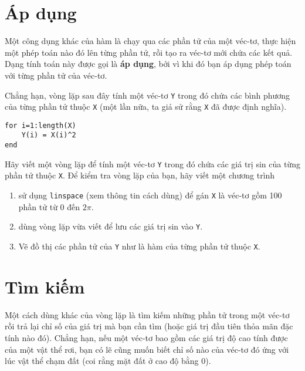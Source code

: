\documentclass[12pt]{book}
\begin{document}
\section{Áp dụng}
\label{apply}

Một công dụng khác của hàm là chạy qua các phần tử của một
véc-tơ, thực hiện một phép toán nào đó lên từng phần tử, rồi
tạo ra véc-tơ mới chứa các kết quả. Dạng tính toán này được
gọi là {\bf áp dụng}, bởi vì khi đó bạn áp dụng phép toán với
từng phần tử của véc-tơ.

Chẳng hạn, vòng lặp sau đây tính một véc-tơ {\tt Y} trong đó
chứa các bình phương của từng phần tử thuộc {\tt X} 
(một lần nữa, ta giả sử rằng {\tt X} đã được định nghĩa).

\begin{verbatim}
for i=1:length(X)
    Y(i) = X(i)^2
end
\end{verbatim}

\begin{ex}
Hãy viết một vòng lặp để tính một véc-tơ {\tt Y} trong đó
chứa các giá trị sin của từng phần tử thuộc {\tt X}.  Để kiểm tra
vòng lặp của bạn, hãy viết một chương trình 

\begin{enumerate}

\item sử dụng {\tt linspace} (xem thông tin cách dùng) để gán
{\tt X} là véc-tơ gồm 100 phần tử từ 0 đến $2 \pi$.

\item dùng vòng lặp vừa viết để lưu các giá trị sin vào {\tt Y}.

\item Vẽ đồ thị các phần tử của {\tt Y} như là hàm của từng phần tử
thuộc {\tt X}.

\end{enumerate}
\end{ex}

\section{Tìm kiếm}
\label{search}

Một cách dùng khác của vòng lặp là tìm kiếm những phần tử trong
một véc-tơ rồi trả lại chỉ số của giá trị mà bạn cần tìm (hoặc
giá trị đầu tiên thỏa mãn đặc tính nào đó). Chẳng hạn, nếu một
véc-tơ bao gồm các giá trị độ cao tính được của một vật thể
rơi, bạn có lẽ cũng muốn biết chỉ số nào của véc-tơ đó ứng với
lúc vật thể chạm đất (coi rằng mặt đất ở cao độ bằng 0).
\end{document}
